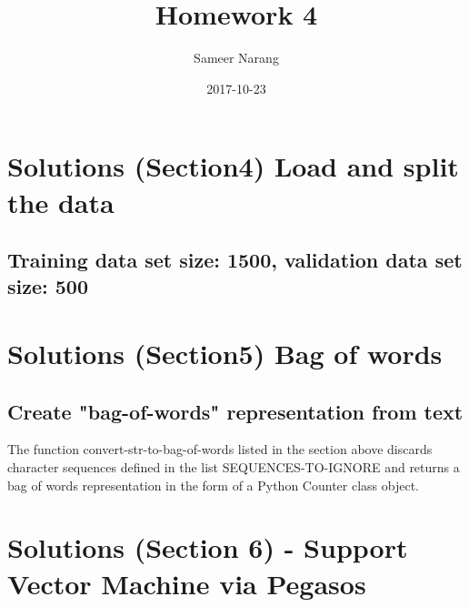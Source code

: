 \documentclass{article}
\title{Homework 4}
\date{2017-10-23}
\author{Sameer Narang}
\begin{document}
\section{Solutions (Section4) Load and split the data}
    \subsection{Training data set size: 1500, validation data set size: 500}
    
\section{Solutions (Section5) Bag of words}
    \subsection{Create "bag-of-words" representation from text}
    The function  convert-\-str-\-to-\-bag-\-of-\-words listed in the section above  discards character sequences defined in the list SEQUENCES-\-TO-\-IGNORE and returns a bag of words representation in the form of a Python Counter class object.
\section{Solutions (Section 6) - Support Vector Machine via Pegasos}
\end{document}
